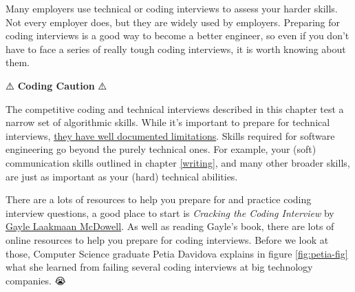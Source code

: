 \documentclass[
]{book}
\begin{document}
Many employers use technical or coding interviews to assess your harder skills. Not every employer does, but they are widely used by employers. Preparing for coding interviews is a good way to become a better engineer, so even if you don't have to face a series of really tough coding interviews, it is worth knowing about them.

⚠️ \textbf{Coding Caution} ⚠️

The competitive coding and technical interviews described in this chapter test a narrow set of algorithmic skills. While it's important to prepare for technical interviews, \href{https://www.quora.com/What-are-some-common-criticisms-of-Cracking-the-Coding-interview}{they have well documented limitations}. \citep{murashenkov} Skills required for software engineering go beyond the purely technical ones. For example, your (soft) communication skills outlined in chapter \ref{writing}, and many other broader skills, are just as important as your (hard) technical abilities.

There are a lots of resources to help you prepare for and practice coding interview questions, a good place to start is \emph{Cracking the Coding Interview} by \href{https://en.wikipedia.org/wiki/Gayle_Laakmann_McDowell}{Gayle Laakmaan McDowell}. \citep{cracking} As well as reading Gayle's book, there are lots of online resources to help you prepare for coding interviews. Before we look at those, Computer Science graduate Petia Davidova explains in figure \ref{fig:petia-fig} what she learned from failing several coding interviews at big technology companies. 😭
\end{document}
